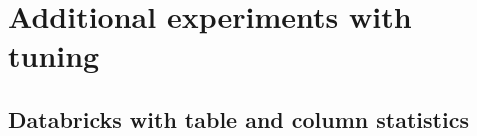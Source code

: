 \section{Additional experiments with tuning}\label{additionalExperiments}

\subsection{Databricks with table and column statistics}\label{databricksWithStatistics}